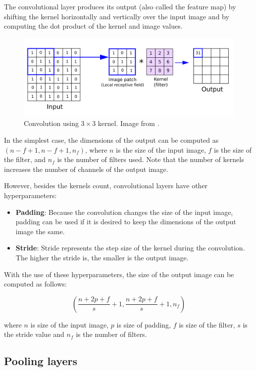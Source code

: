 \documentclass[thesis=B,english]{FITthesis}[2019/12/23]
\begin{document}
The convolutional layer produces its output (also called the feature map) by shifting the kernel horizontally and vertically over the input image and by computing the dot product of the kernel and image values.

\begin{figure}[ht]
		\includegraphics[scale=0.08]{images/conv_op.png}
		\centering
		\caption{Convolution using $3\times 3$ kernel. Image from \cite{convolution_op}.}
\end{figure}

In the simplest case, the dimensions of the output can be computed as $(n - f + 1, n - f + 1, n_f)$, where $n$ is the size of the input image, $f$ is the size of the filter, and $n_f$ is the number of filters used. Note that the number of kernels increases the number of channels of the output image.

However, besides the kernels count, convolutional layers have other hyperparameters:

\begin{itemize}
	\item \textbf{Padding}: Because the convolution changes the size of the input image, padding can be used if it is desired to keep the dimensions of the output image the same.
	\item \textbf{Stride}: Stride represents the step size of the kernel during the convolution. The higher the stride is, the smaller is the output image.
\end{itemize}

With the use of these hyperparameters, the size of the output image can be computed as follows:

$$
\left( \frac{n+2p+f}{s}+1, \frac{n+2p+f}{s}+1, n_f \right)
$$

where $n$ is size of the input image, $p$ is size of padding, $f$ is size of the filter, $s$ is the stride value and $n_f$ is the number of filters.

\subsection{Pooling layers}
\end{document}
